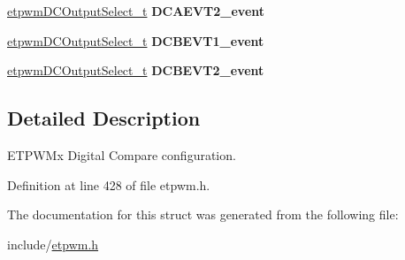 \begin{DoxyCompactItemize}
\item 
\mbox{\label{structetpwmDigitalCompareConfig__t_ac1e52a1a87d4228cc78218f30967e14c}} 
\mbox{\hyperlink{etpwm_8h_a320d139cfe64e8a4bd00653a21aa6a7f}{etpwm\+D\+C\+Output\+Select\+\_\+t}} {\bfseries D\+C\+A\+E\+V\+T2\+\_\+event}
\item 
\mbox{\label{structetpwmDigitalCompareConfig__t_ae3a0a7fc3254bbf047caa3dc8f7015d9}} 
\mbox{\hyperlink{etpwm_8h_a320d139cfe64e8a4bd00653a21aa6a7f}{etpwm\+D\+C\+Output\+Select\+\_\+t}} {\bfseries D\+C\+B\+E\+V\+T1\+\_\+event}
\item 
\mbox{\label{structetpwmDigitalCompareConfig__t_a4ee38d7c64340dc925198985e30b8725}} 
\mbox{\hyperlink{etpwm_8h_a320d139cfe64e8a4bd00653a21aa6a7f}{etpwm\+D\+C\+Output\+Select\+\_\+t}} {\bfseries D\+C\+B\+E\+V\+T2\+\_\+event}
\end{DoxyCompactItemize}


\subsection{Detailed Description}
E\+T\+P\+W\+Mx Digital Compare configuration. 

Definition at line 428 of file etpwm.\+h.



The documentation for this struct was generated from the following file\+:\begin{DoxyCompactItemize}
\item 
include/\mbox{\hyperlink{etpwm_8h}{etpwm.\+h}}\end{DoxyCompactItemize}
